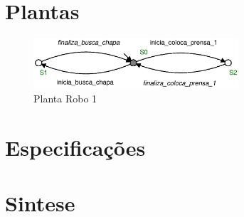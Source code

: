 \section{Plantas}
\begin{figure}
    \centering
    \includegraphics[width=3in]{imagens/Robo_1}
    \caption{Planta Robo 1}\label{fig:Robo1}
\end{figure}
\section{Especificações}
\section{Sintese}